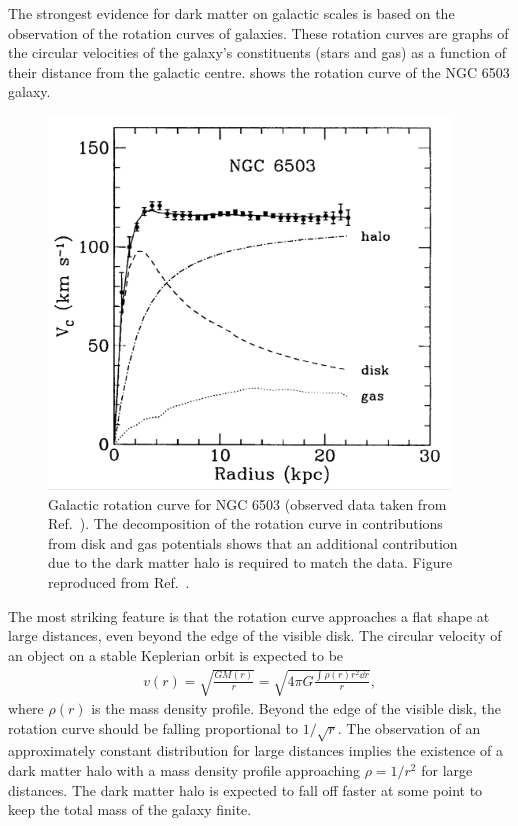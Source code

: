 The strongest evidence for dark matter on galactic scales is based on the observation of the rotation curves of galaxies. These rotation curves are graphs of the circular velocities of the galaxy's constituents (stars and gas) as a function of their distance from the galactic centre.
 shows the rotation curve of the NGC 6503 galaxy.
\begin{figure}[htbp]
    \centering
    \includegraphics[width=0.95\textwidth]{figures/darkmatter/rotationcurve.png}
    \caption{Galactic rotation curve for NGC 6503 (observed data taken from Ref.~\cite{Burbidge1964}). The decomposition of the rotation curve in contributions from disk and gas potentials shows that an additional contribution due to the dark matter halo is required to match the data. Figure reproduced from Ref.~\cite{Freese2008}.}
    \label{fig:darkmatter-rotationcurve}
\end{figure}
The most striking feature is that the rotation curve approaches a flat shape at large distances, even beyond the edge of the visible disk. The circular velocity of an object on a stable Keplerian orbit is expected to be
\begin{align}
    v(r) = \sqrt{\frac{G M(r)}{r}} = \sqrt{4 \pi G \frac{\int \rho(r) r^2 \dd{r}}{r}},
\end{align}
where \(\rho(r)\) is the mass density profile. Beyond the edge of the visible disk, the rotation curve should be falling proportional to \(1 / \sqrt{r}\). The observation of an approximately constant distribution for large distances implies the existence of a dark matter halo with a mass density profile approaching \(\rho = 1 / r^2\) for large distances. The dark matter halo is expected to fall off faster at some point to keep the total mass of the galaxy finite.

